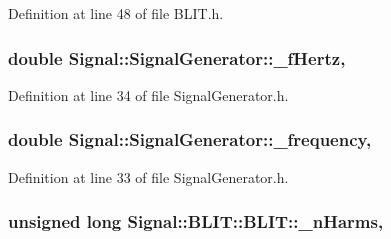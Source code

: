 Definition at line 48 of file B\+L\+I\+T.\+h.

\hypertarget{classSignal_1_1SignalGenerator_a85a4702347352bab1c71e0a8df8437d6}{
\subsubsection[{\+\_\+f\+Hertz}]{\setlength{\rightskip}{0pt plus 5cm}double Signal\+::\+Signal\+Generator\+::\+\_\+f\+Hertz\hspace{0.3cm}{\ttfamily [protected]}, {\ttfamily [inherited]}}}\label{classSignal_1_1SignalGenerator_a85a4702347352bab1c71e0a8df8437d6}


Definition at line 34 of file Signal\+Generator.\+h.

\hypertarget{classSignal_1_1SignalGenerator_a7f107461333bce68c5dad412db96a8c2}{
\subsubsection[{\+\_\+frequency}]{\setlength{\rightskip}{0pt plus 5cm}double Signal\+::\+Signal\+Generator\+::\+\_\+frequency\hspace{0.3cm}{\ttfamily [protected]}, {\ttfamily [inherited]}}}\label{classSignal_1_1SignalGenerator_a7f107461333bce68c5dad412db96a8c2}


Definition at line 33 of file Signal\+Generator.\+h.

\hypertarget{classSignal_1_1BLIT_1_1BLIT_a0bfbf4e7515a42fab7df748b8497f648}{
\subsubsection[{\+\_\+n\+Harms}]{\setlength{\rightskip}{0pt plus 5cm}unsigned long Signal\+::\+B\+L\+I\+T\+::\+B\+L\+I\+T\+::\+\_\+n\+Harms\hspace{0.3cm}{\ttfamily [protected]}, {\ttfamily [inherited]}}}\label{classSignal_1_1BLIT_1_1BLIT_a0bfbf4e7515a42fab7df748b8497f648}


